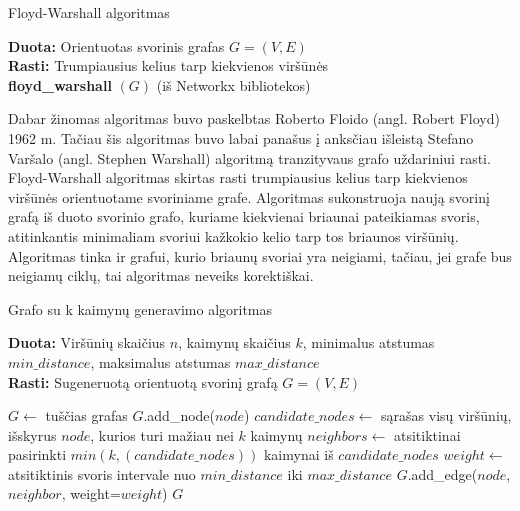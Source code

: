 \documentclass[bibliography=totoc]{article}
\begin{document}
\begin{algorithm}[h]
    \caption{Floyd-Warshall algoritmas}
    \textbf{Duota:} Orientuotas svorinis grafas $G=(V,E)$\\
    \textbf{Rasti:} Trumpiausius kelius tarp kiekvienos viršūnės\\
    \textbf{floyd\_warshall} $(G)$ (iš Networkx bibliotekos)
\end{algorithm}

 Dabar žinomas algoritmas buvo paskelbtas Roberto Floido (angl. Robert Floyd) 1962 m. Tačiau šis algoritmas buvo labai panašus į anksčiau išleistą Stefano Varšalo (angl. Stephen Warshall) algoritmą tranzityvaus grafo uždariniui rasti.
 Floyd-Warshall algoritmas skirtas rasti trumpiausius kelius tarp kiekvienos viršūnės orientuotame svoriniame grafe. Algoritmas sukonstruoja naują svorinį grafą iš  duoto svorinio grafo, kuriame kiekvienai briaunai pateikiamas svoris, atitinkantis minimaliam svoriui kažkokio kelio tarp tos briaunos viršūnių. Algoritmas tinka ir grafui, kurio briaunų svoriai yra neigiami, tačiau, jei grafe bus neigiamų ciklų, tai algoritmas neveiks korektiškai.

\begin{algorithm}[h]
    \caption{Grafo su k kaimynų generavimo algoritmas}
    \textbf{Duota:} Viršūnių skaičius $n$, kaimynų skaičius $k$, minimalus atstumas $min\_distance$, maksimalus atstumas $max\_distance$\\
    \textbf{Rasti:} Sugeneruotą orientuotą svorinį grafą $G=(V, E)$
    \begin{algorithmic}[1]
        \STATE $G \gets$ tuščias grafas
            \STATE $G$.add\_node($node$)
        \ENDFOR
            \STATE $candidate\_nodes \gets$ sąrašas visų viršūnių, išskyrus $node$, kurios turi mažiau nei $k$ kaimynų
            \STATE $neighbors \gets$ atsitiktinai pasirinkti $min(k, (candidate\_nodes))$ kaimynai iš $candidate\_nodes$
                \STATE $weight \gets$ atsitiktinis svoris intervale nuo $min\_distance$ iki $max\_distance$
                \STATE $G$.add\_edge($node$, $neighbor$, weight=$weight$)
            \ENDFOR
        \ENDFOR
        \RETURN $G$
    \end{algorithmic}
\end{algorithm}
\end{document}
